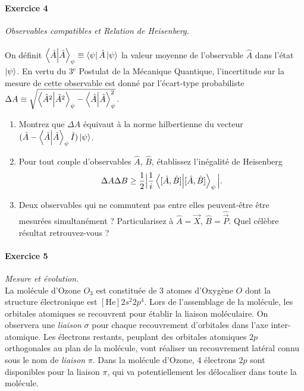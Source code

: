 \paragraph{Exercice 4} \textit{Observables compatibles et Relation de Heisenberg.} \\\vspace{-10pt}\\

On définit $\braket{\hat A}_\psi \equiv \bra{\psi} \hat A \ket{\psi}$ la valeur moyenne de l'observable $\hat A$ dans l'état $\ket{\psi}$. En vertu du 3$^{\text{e}}$ Postulat de la Mécanique Quantique, l'incertitude sur la mesure de cette observable est donné par l'écart-type probabiliste $\Delta A \equiv \sqrt{\braket{\hat A^2}_\psi - \braket{\hat A}_\psi^2}$. 
\begin{enumerate}
	\item Montrez que $\Delta A$ équivaut à la norme hilbertienne du vecteur $(\hat A - \braket{\hat A}_\psi \hat I) \ket{\psi}$.
	\item Pour tout couple d'observables $\hat A$, $\hat B$, établissez l'inégalité de Heisenberg
		\begin{equation}
		\Delta A \Delta B \geq \frac{1}{2} \Big| \frac{1}{i} \braket{[\hat A,\hat B]}_\psi \Big|.
		\end{equation}
	\item Deux observables qui ne commutent pas entre elles peuvent-être être mesurées simultanément ? Particularisez à $\hat A = \hat{\vec{X}}$, $\hat B = \hat{\vec{P}}$. Quel célèbre résultat retrouvez-vous ?
\end{enumerate}

\newpage
\paragraph{Exercice 5} \textit{Mesure et évolution.} \\
La molécule d'Ozone $O_3$ est constituée de 3 atomes d'Oxygène $O$ dont la structure électronique est $[\text{He}]2s^2 2p^4$. Lors de l'assemblage de la molécule, les orbitales atomiques se recouvrent pour établir la liaison moléculaire. On observera une \textit{liaison} $\sigma$ pour chaque recouvrement d'orbitales dans l'axe inter-atomique. Les électrons restants, peuplant des orbitales atomiques $2p$ orthogonales au plan de la molécule, vont réaliser un recouvrement latéral connu sous le nom de \textit{liaison} $\pi$. Dans la molécule d'Ozone, 4 électrons $2p$ sont disponibles pour la liaison $\pi$, qui va potentiellement les délocaliser dans toute la molécule. \\

